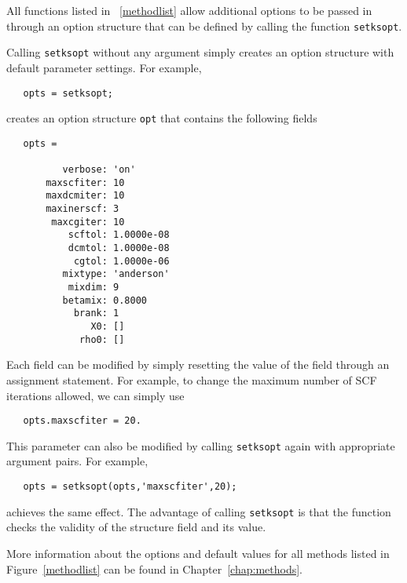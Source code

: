 \documentclass[11pt]{book}
\begin{document}
All functions listed in ~\ref{methodlist} allow additional options to be
passed in through an option structure that can be defined by calling
the function {\tt setksopt}.  

Calling {\tt setksopt} without any argument simply creates an option
structure with default parameter settings. For example,
\begin{verbatim}
   opts = setksopt;
\end{verbatim}
creates an option structure {\tt opt} that contains the following fields
\begin{verbatim}
   opts = 

          verbose: 'on'
       maxscfiter: 10
       maxdcmiter: 10
       maxinerscf: 3
        maxcgiter: 10
           scftol: 1.0000e-08
           dcmtol: 1.0000e-08
            cgtol: 1.0000e-06
          mixtype: 'anderson'
           mixdim: 9
          betamix: 0.8000
            brank: 1
               X0: []
             rho0: []
\end{verbatim}

Each field can be modified by simply resetting the value of the field 
through an assignment statement. For example, to change the maximum
number of SCF iterations allowed, we can simply use
\begin{verbatim}
   opts.maxscfiter = 20.
\end{verbatim}
This parameter can also be modified by calling {\tt setksopt} again with
appropriate argument pairs. For example,
\begin{verbatim}
   opts = setksopt(opts,'maxscfiter',20);
\end{verbatim}
achieves the same effect.  The advantage of calling {\tt setksopt} is
that the function checks the validity of the structure field and its
value.

More information about the options and default values for all methods listed
in Figure~\ref{methodlist} can be found in Chapter~\ref{chap:methods}. 
\end{document}
